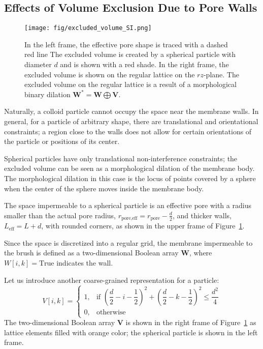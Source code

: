 \documentclass[10pt, a4paper]{article}
\begin{document}
\subsection*{Effects of Volume Exclusion Due to Pore Walls}

\begin{multicols}{2}

\begin{figure}[H]
    \centering
    \texttt{[image: fig/excluded\_volume\_SI.png]}
    \caption{
        In the left frame, the effective pore shape is traced with a dashed red line
        The excluded volume is created by a spherical particle with diameter $d$ and is shown with a red shade.
        In the right frame, the excluded volume is shown on the regular lattice on the $rz$-plane.
        The excluded volume on the regular lattice is a result of a morphological binary dilation $\bm{W}^{\ast} = \bm{W} \bigoplus \bm{V}$.
        }
    \label{fig:excluded_volume}
\end{figure}

Naturally, a colloid particle cannot occupy the space near the membrane walls.
In general, for a particle of arbitrary shape, there are translational and orientational constraints; a region close to the walls does not allow for certain orientations of the particle or positions of its center.

Spherical particles have only translational non-interference constraints; the excluded volume can be seen as a morphological dilation of the membrane body.
The morphological dilation in this case is the locus of points covered by a sphere when the center of the sphere moves inside the membrane body.

The space impermeable to a spherical particle is an effective pore with a radius smaller than the actual pore radius, $r_{\textrm{pore,eff}} = r_{\textrm{pore}} - \frac{d}{2}$, and thicker walls, $L_{\textrm{eff}} = L + d$, with rounded corners, as shown in the upper frame of Figure~\ref{fig:excluded_volume}.

Since the space is discretized into a regular grid, the membrane impermeable to the brush is defined as a two-dimensional Boolean array $\bm{W}$, where $W[i, k] = \textrm{True}$ indicates the wall.

Let us introduce another coarse-grained representation for a particle:
\begin{equation}
    V[i, k] = 
    \begin{cases}
            1, & \text{if } \left( \dfrac{d}{2} - i - \dfrac{1}{2} \right)^2 + \left( \dfrac{d}{2} - k - \dfrac{1}{2} \right)^2 \le \dfrac{d^2}{4} \\
            0, & \text{otherwise}
        \end{cases}
\end{equation}
The two-dimensional Boolean array $\bm{V}$ is shown in the right frame of Figure~\ref{fig:excluded_volume} as lattice elements filled with orange color; the spherical particle is shown in the left frame.


\end{multicols}
\end{document}
